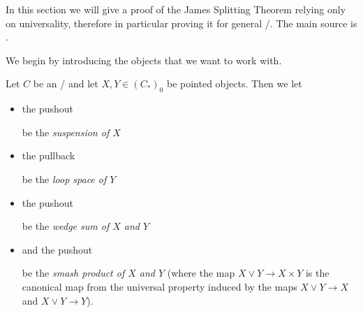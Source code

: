 In this section we will give a proof of the James Splitting Theorem relying only on universality, therefore in particular proving it for general \inftytops/. 
The main source is %
.

We begin by introducing the objects that we want to work with.
\begin{definition}
    Let $C$ be an \inftytop/ and let $X,Y\in \left(C_*\right)_0$ be pointed objects. 
    Then we let 
    \begin{itemize}
        \item the pushout
        \begin{center}
        \end{center}
        be the \emph{suspension of $X$}
        \item the pullback
        \begin{center}
        \end{center}
        be the \emph{loop space of $Y$}
        \item the pushout
        \begin{center}
        \end{center}
        be the \emph{wedge sum of $X$ and $Y$} 
        \item and the pushout 
        \begin{center}
        \end{center}
        be the \emph{smash product of $X$ and $Y$} (where the map $X\vee Y\to X\times Y$ is the canonical map from the universal property induced by the maps $X\vee Y\to X$ and $X\vee Y\to Y$).
    \end{itemize}
\end{definition}
